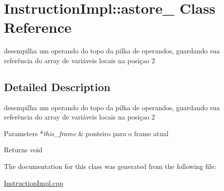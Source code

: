 \hypertarget{class_instruction_impl_1_1astore__2}{}\section{Instruction\+Impl\+:\+:astore\+\_ Class Reference}
\label{class_instruction_impl_1_1astore__2}


desempilha um operando do topo da pilha de operandos, guardando sua referência do array de variáveis locais na posiçao 2  




\subsection{Detailed Description}
desempilha um operando do topo da pilha de operandos, guardando sua referência do array de variáveis locais na posiçao 2 


\begin{DoxyParams}{Parameters}
{\em $\ast$this\+\_\+frame} & ponteiro para o frame atual \\
\hline
\end{DoxyParams}
\begin{DoxyReturn}{Returns}
void 
\end{DoxyReturn}


The documentation for this class was generated from the following file\+:\begin{DoxyCompactItemize}
\item 
\hyperlink{_instruction_impl_8cpp}{Instruction\+Impl.\+cpp}\end{DoxyCompactItemize}
